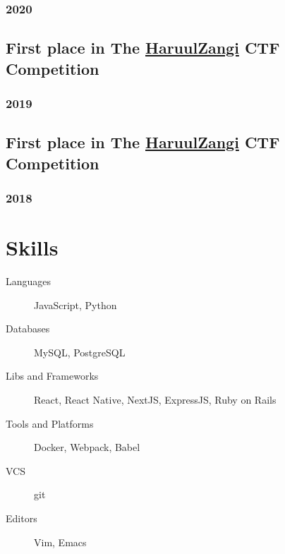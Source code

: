 \documentclass[letterpaper]{article}
\begin{document}
\subsubsection{2020}
\label{sec:orgce9e55d}
\subsection{First place in The \href{http:www.haruulzangi.mn}{HaruulZangi} CTF Competition}
\label{sec:org4524338}
\subsubsection{2019}
\label{sec:org66001dd}
\subsection{First place in The \href{http:www.haruulzangi.mn}{HaruulZangi} CTF Competition}
\label{sec:org873c516}
\subsubsection{2018}
\label{sec:orgc4dbc1f}
\section{Skills}
\label{sec:org39513b5}
\begin{description}
\item[{Languages}] JavaScript, Python
\item[{Databases}] MySQL, PostgreSQL
\item[{Libs and Frameworks}] React, React Native, NextJS, ExpressJS, Ruby on Rails
\item[{Tools and Platforms}] Docker, Webpack, Babel
\item[{VCS}] git
\item[{Editors}] Vim, Emacs
\end{description}
\end{document}
